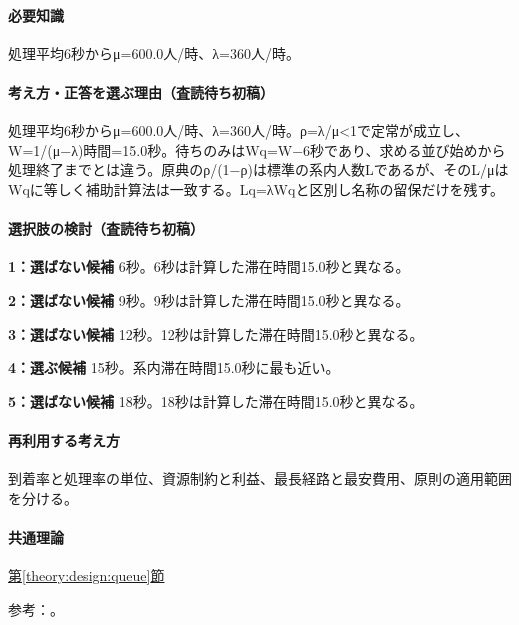 \paragraph{必要知識} 処理平均6秒からμ=600.0人/時、λ=360人/時。

\paragraph{考え方・正答を選ぶ理由（査読待ち初稿）} 処理平均6秒からμ=600.0人/時、λ=360人/時。ρ=λ/μ<1で定常が成立し、W=\allowbreak{}1/(μ−λ)時間=15.0秒。待ちのみはWq=\allowbreak{}W−6秒であり、求める並び始めから処理終了までとは違う。原典のρ/(1−ρ)は標準の系内人数Lであるが、そのL/μはWqに等しく補助計算法は一致する。Lq=λWqと区別し名称の留保だけを残す。

\paragraph{選択肢の検討（査読待ち初稿）}\mbox{}\par

\noindent\textbf{1：選ばない候補} 6秒。6秒は計算した滞在時間15.0秒と異なる。\par

\noindent\textbf{2：選ばない候補} 9秒。9秒は計算した滞在時間15.0秒と異なる。\par

\noindent\textbf{3：選ばない候補} 12秒。12秒は計算した滞在時間15.0秒と異なる。\par

\noindent\textbf{4：選ぶ候補} 15秒。系内滞在時間15.0秒に最も近い。\par

\noindent\textbf{5：選ばない候補} 18秒。18秒は計算した滞在時間15.0秒と異なる。\par

\paragraph{再利用する考え方} 到着率と処理率の単位、資源制約と利益、最長経路と最安費用、原則の適用範囲を分ける。

\paragraph{共通理論} \hyperref[theory:design:queue]{第\ref*{theory:design:queue}節}

\par 参考：\cite{design48_queue_ref}。

